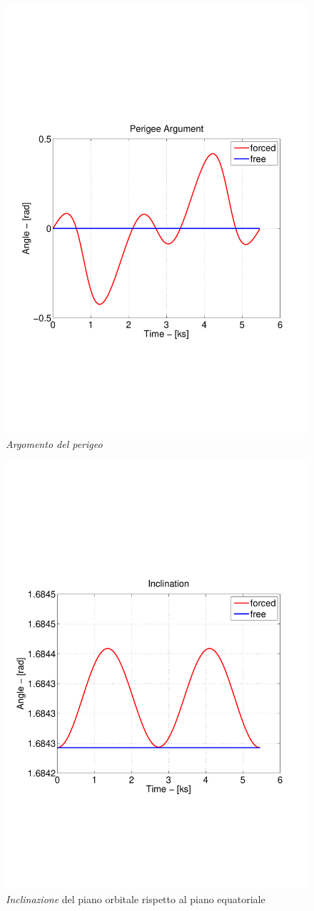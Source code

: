 \begin{figure}
	\includegraphics[width=.6\textwidth,clip=true,trim=1cm
	6cm
	1cm
	8cm]{modelling/orbit_dynamics/image/perigee_argument.pdf}
	\caption{\emph{Argomento del perigeo}}
\end{figure}

\begin{figure}
	\includegraphics[width=.6\textwidth,clip=true,trim=1cm
	6cm
	1cm
	8cm]{modelling/orbit_dynamics/image/inclination.pdf}
	\caption{\emph{Inclinazione} del piano orbitale rispetto al piano equatoriale}
\end{figure}

